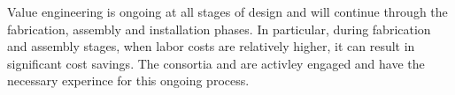 Value engineering is ongoing at all stages of design and will continue
through the fabrication, assembly and installation phases. In
particular, during fabrication and assembly stages, when labor costs
are relatively higher, it can result in significant cost savings. The
consortia and  are activley engaged and have the necessary
experince for this ongoing process.
